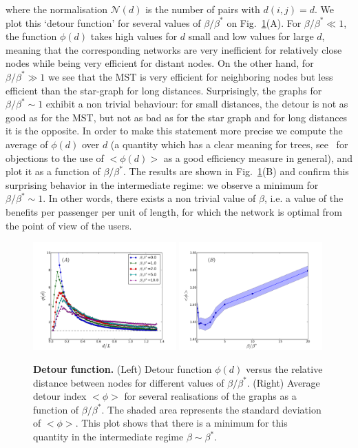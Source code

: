 where the normalisation $\mathcal{N}(d)$ is the number of pairs with $d(i,j)=d$.
We plot this `detour function' for several values of $\beta/\beta^*$ on
Fig.~\ref{fig:RLE}(A). For $\beta/\beta^* \ll 1$, the function $\phi(d)$ takes
high values for $d$ small and low values for large $d$, meaning that the
corresponding networks are very inefficient for relatively close nodes while
being very efficient for distant nodes. On the other hand, for $\beta/\beta^*
\gg 1$ we see that the MST is very efficient for neighboring nodes but less
efficient than the star-graph for long distances. Surprisingly, the graphs for
$\beta/\beta^* \sim 1$ exhibit a non trivial behaviour: for small distances, the
detour is not as good as for the MST, but not as bad as for the star graph and
for long distances it is the opposite. In order to make this statement more
precise we compute the average of $\phi(d)$ over $d$ (a quantity which has a
clear meaning for trees, see~\cite{Aldous:2010} for objections to the use of $<
\phi(d) >$ as a good efficiency measure in general), and plot it as a function
of $\beta/\beta^*$. The results are shown in Fig.~\ref{fig:RLE}(B) and confirm
this surprising behavior in the intermediate regime: we observe a minimum for
$\beta/\beta^* \sim 1$. In other words, there exists a non trivial value of
$\beta$, i.e. a value of the benefits per passenger per unit of length, for
which the network is optimal from the point of view of the users. 

\begin{figure}
    \centering
    \includegraphics[width=0.49\textwidth]{gfx/chapter-networks/figure8a.pdf}
    \includegraphics[width=0.49\textwidth]{gfx/chapter-networks/figure8b.pdf}
    \caption{{\bf Detour function.} (Left) Detour function $\phi (d)$ versus the
        relative distance between nodes for different values of $\beta/\beta^*$.
        (Right) Average detour index $< \phi >$  for several realisations of the
        graphs as a function of $\beta/\beta^*$. The shaded area represents the
        standard deviation of $< \phi >$. This plot shows that there is a
        minimum for this quantity in the intermediate regime $\beta\sim\beta^*$.
\label{fig:RLE}} 
\end{figure}


